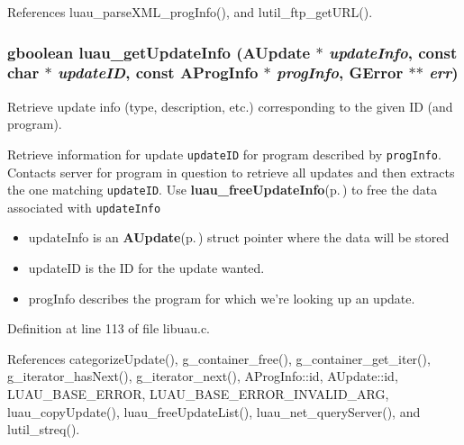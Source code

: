 References luau\_\-parse\-XML\_\-prog\-Info(), and lutil\_\-ftp\_\-get\-URL().
\subsubsection{\setlength{\rightskip}{0pt plus 5cm}gboolean luau\_\-get\-Update\-Info ({\bf AUpdate} $\ast$ {\em update\-Info}, const char $\ast$ {\em update\-ID}, const {\bf AProg\-Info} $\ast$ {\em prog\-Info}, GError $\ast$$\ast$ {\em err})}\label{libuau_8h_a52}


Retrieve update info (type, description, etc.) corresponding to the given ID (and program). 

Retrieve information for update {\tt update\-ID} for program described by {\tt prog\-Info}. Contacts server for program in question to retrieve all updates and then extracts the one matching {\tt update\-ID}. Use {\bf luau\_\-free\-Update\-Info}{\rm (p.\,\pageref{libuau_8h_a97})} to free the data associated with {\tt update\-Info} 

\begin{itemize}
\item update\-Info is an {\bf AUpdate}{\rm (p.\,\pageref{structAUpdate})} struct pointer where the data will be stored \item update\-ID is the ID for the update wanted. \item prog\-Info describes the program for which we're looking up an update. 
\end{itemize}


Definition at line 113 of file libuau.c.

References categorize\-Update(), g\_\-container\_\-free(), g\_\-container\_\-get\_\-iter(), g\_\-iterator\_\-has\-Next(), g\_\-iterator\_\-next(), AProg\-Info::id, AUpdate::id, LUAU\_\-BASE\_\-ERROR, LUAU\_\-BASE\_\-ERROR\_\-INVALID\_\-ARG, luau\_\-copy\-Update(), luau\_\-free\-Update\-List(), luau\_\-net\_\-query\-Server(), and lutil\_\-streq().
